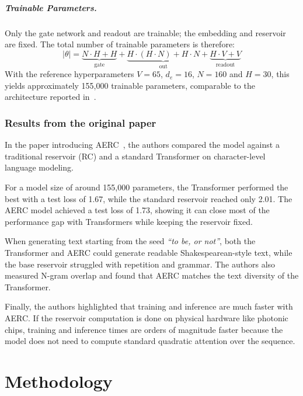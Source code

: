 \documentclass{sapthesis}
\begin{document}
\paragraph{Trainable Parameters.}
Only the gate network and readout are trainable; the embedding and reservoir are fixed. The total number of trainable parameters is therefore:
\[
  |\theta| = \underbrace{N \cdot H + H}_{\text{gate}} + \underbrace{H \cdot (H \cdot N) + H \cdot N}_{\text{out}} + \underbrace{H \cdot V + V}_{\text{readout}}
\]
With the reference hyperparameters $V=65$, $d_e=16$, $N=160$ and $H=30$, this yields approximately 155{,}000 trainable parameters, comparable to the architecture reported in~\cite{koster2024attentionenhancedreservoircomputing}.

\subsection{Results from the original paper}
In the paper introducing AERC~\cite{koster2024attentionenhancedreservoircomputing}, the authors compared the model against a traditional reservoir (RC) and a standard Transformer on character-level language modeling. 

For a model size of around 155,000 parameters, the Transformer performed the best with a test loss of 1.67, while the standard reservoir reached only 2.01. The AERC model achieved a test loss of 1.73, showing it can close most of the performance gap with Transformers while keeping the reservoir fixed.

When generating text starting from the seed \textit{``to be, or not''}, both the Transformer and AERC could generate readable Shakespearean-style text, while the base reservoir struggled with repetition and grammar. The authors also measured N-gram overlap and found that AERC matches the text diversity of the Transformer.

Finally, the authors highlighted that training and inference are much faster with AERC. If the reservoir computation is done on physical hardware like photonic chips, training and inference times are orders of magnitude faster because the model does not need to compute standard quadratic attention over the sequence.



\chapter{Methodology}
\end{document}
